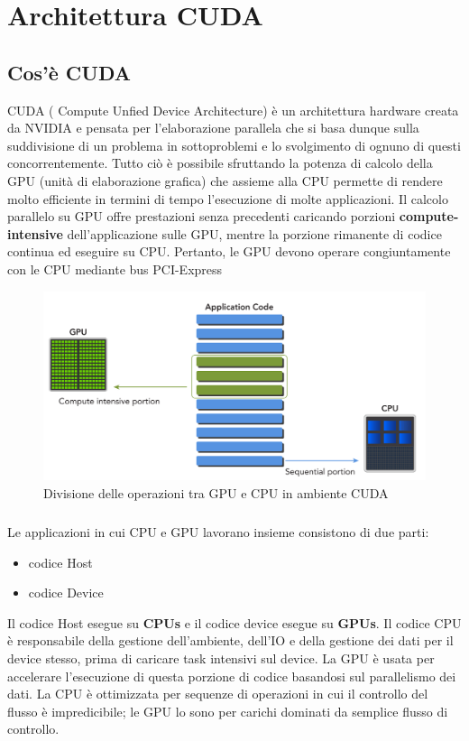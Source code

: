 \chapter{Architettura CUDA}
\section{Cos'è CUDA}
CUDA ( Compute Unfied Device Architecture) è un architettura hardware creata da NVIDIA e pensata per l’elaborazione parallela che si basa dunque sulla suddivisione di un problema in sottoproblemi e lo svolgimento di ognuno di questi concorrentemente.
Tutto ciò è possibile sfruttando la potenza di calcolo della GPU (unità di elaborazione grafica) che assieme alla CPU permette di rendere molto efficiente in termini di tempo l’esecuzione di molte applicazioni.
Il calcolo parallelo su GPU offre prestazioni senza precedenti caricando porzioni \textbf{compute-intensive} dell'applicazione sulle GPU, mentre la porzione rimanente di codice continua ed eseguire su CPU. Pertanto, le GPU devono operare congiuntamente con le CPU mediante bus PCI-Express

\begin{figure}[H]
\centering
\includegraphics[scale=0.3]{img/cpu-gpu.png}
\caption{Divisione delle operazioni tra GPU e CPU in ambiente CUDA}
\end{figure}

\paragraph{}
Le applicazioni in cui CPU e GPU lavorano insieme consistono di due parti:
\begin{itemize}
\item codice Host
\item codice Device
\end{itemize}


Il codice Host esegue su \textbf{CPUs} e il codice device esegue su \textbf{GPUs}. Il codice CPU è responsabile della gestione dell'ambiente, dell'IO e della gestione dei dati per il device stesso, prima di caricare task intensivi sul device. La GPU è usata per accelerare l'esecuzione di questa porzione di codice basandosi sul parallelismo dei dati. La CPU è ottimizzata per sequenze di operazioni in cui il controllo del flusso è impredicibile; le GPU lo sono per carichi dominati da semplice flusso di controllo.

